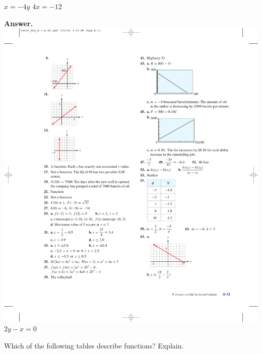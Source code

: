 \documentclass[10pt,]{book}
\theoremstyle{plain}
\theoremstyle{definition}
\theoremstyle{definition}
\theoremstyle{definition}
\theoremstyle{definition}
\numberwithin{equation}{part}
\begin{document}
\begin{exercisegroup}
%
\exercise[12.]\hypertarget{exercise-408}{}\(x = -4y\)%
\exercise[13.]\hypertarget{exercise-409}{}\(4x = -12\)%
\par\smallskip
\noindent\textbf{Answer.}\hypertarget{answer-228}{}\quad
\includegraphics[width=0.4\linewidth]{images/fig-ans-chap1-rev-13}
%
\exercise[14.]\hypertarget{exercise-410}{}\(2y - x = 0\)%
\end{exercisegroup}
\par\smallskip\noindent
\hypertarget{exercisegroup-53}{}\par\noindent Which of the following tables describe functions? Explain.%
\end{document}
